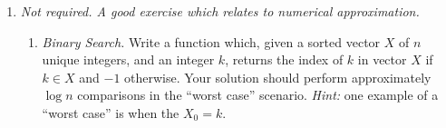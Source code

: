 \documentclass[10pt,letterpaper]{article}
\begin{document}
\begin{enumerate}
  \item \emph{Not required.  A good exercise which relates to numerical approximation.} \begin{enumerate}
    \item \emph{Binary Search.} Write a function which, given a sorted vector $X$ of $n$ unique integers, and an integer $k$, returns the index of $k$ in vector $X$ if $k \in X$ and $-1$ otherwise.  Your solution should perform approximately $\log n$ comparisons in the ``worst case'' scenario. \emph{Hint:}  one example of a ``worst case'' is when the $X_0 = k$.
  \end{enumerate}
  \end{enumerate}
\end{document}

